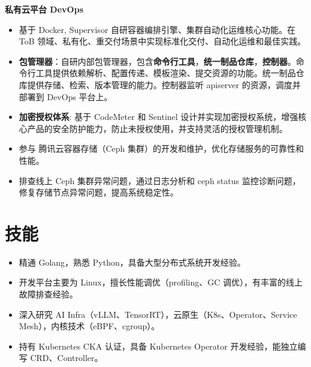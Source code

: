 \documentclass{resume}
\begin{document}
\textbf{私有云平台 DevOps}
\begin{itemize}[parsep=0.5ex]
  \item 基于 Docker, Supervisor 自研容器编排引擎、集群自动化运维核心功能。在 ToB 领域、私有化、重交付场景中实现标准化交付、自动化运维和最佳实践。
  \item \textbf{包管理器}：自研内部包管理器，包含\textbf{命令行工具}，\textbf{统一制品仓库}，\textbf{控制器}。命令行工具提供依赖解析、配置传递、模板渲染、提交资源的功能。统一制品仓库提供存储、检索、版本管理的能力。控制器监听 apiserver 的资源，调度并部署到 DevOps 平台上。
  \item \textbf{加密授权体系}: 基于 CodeMeter 和 Sentinel 设计并实现加密授权系统，增强核心产品的安全防护能力，防止未授权使用，并支持灵活的授权管理机制。
\end{itemize}

\begin{itemize}[parsep=0.5ex]
  \item 参与 腾讯云容器存储（Ceph 集群）的开发和维护，优化存储服务的可靠性和性能。
  \item 排查线上 Ceph 集群异常问题，通过日志分析和 ceph status 监控诊断问题，修复存储节点异常问题，提高系统稳定性。
\end{itemize}


\section{技能}
\begin{itemize}[parsep=0.5ex]
  \item 精通 Golang，熟悉 Python，具备大型分布式系统开发经验。
  \item 开发平台主要为 Linux，擅长性能调优（profiling、GC 调优），有丰富的线上故障排查经验。
  \item 深入研究 AI Infra（vLLM、TensorRT），云原生（K8s、Operator、Service Mesh），内核技术（eBPF、cgroup）。
  \item 持有 Kubernetes CKA 认证，具备 Kubernetes Operator 开发经验，能独立编写 CRD、Controller。
\end{itemize}
\end{document}
